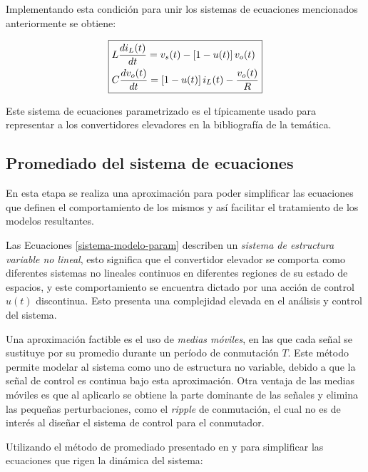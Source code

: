 Implementando esta condición para unir los sistemas de ecuaciones mencionados anteriormente se obtiene:

\begin{equation}
  \boxed{
    \begin{split}
      & L \frac{di_L(t)}{dt} = v_s(t) - \left[1-u(t)\right]v_o(t) \vspace{0.5cm}
      \\
      & C \frac{dv_o(t)}{dt} = \left[1-u(t)\right] i_L(t)- \frac{v_o(t)}{R}
  \end{split}
    }
  \label{sistema-modelo-param}
  \end{equation}

Este sistema de ecuaciones parametrizado es el típicamente usado para representar a los convertidores elevadores en la bibliografía de la temática.

\subsection{Promediado del sistema de ecuaciones}

En esta etapa se realiza una aproximación para poder simplificar las ecuaciones que definen el comportamiento de los mismos y así facilitar el tratamiento de los modelos resultantes.

Las Ecuaciones \ref{sistema-modelo-param} describen un \emph{sistema de estructura variable no lineal}, esto significa que el convertidor elevador se comporta como diferentes sistemas no lineales continuos en diferentes regiones de su estado de espacios, y este comportamiento se encuentra dictado por una acción de control $u(t)$ discontinua. Esto presenta una complejidad elevada en el análisis y control del sistema.

Una aproximación factible es el uso de \emph{medias móviles}, en las que cada señal se sustituye por su promedio durante un período de conmutación $T$. Este método permite modelar al sistema como uno de estructura no variable, debido a que la señal de control es continua bajo esta aproximación. Otra ventaja de las medias móviles es que al aplicarlo se obtiene la parte dominante de las señales y elimina las pequeñas perturbaciones, como el \emph{ripple} de conmutación, el cual no es de interés al diseñar el sistema de control para el conmutador.

Utilizando el método de promediado presentado en \cite{erickson} y \cite{hart} para simplificar las ecuaciones que rigen la dinámica del sistema:

